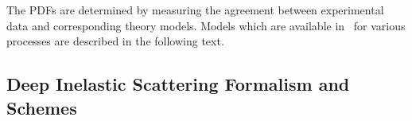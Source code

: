 
\def\kt{\ensuremath{k_t}}
\newcommand{\Pmax}{p}
\newcommand{\CCFM}{CCFMa,CCFMb,Catani:1989sg,CCFMd}


%
The PDFs are determined by measuring 
the agreement between experimental data and corresponding theory models. 
Models which are available in \fitter\ for various processes are described in the following text.


\subsection{Deep Inelastic Scattering Formalism and Schemes}
\label{dissection}


